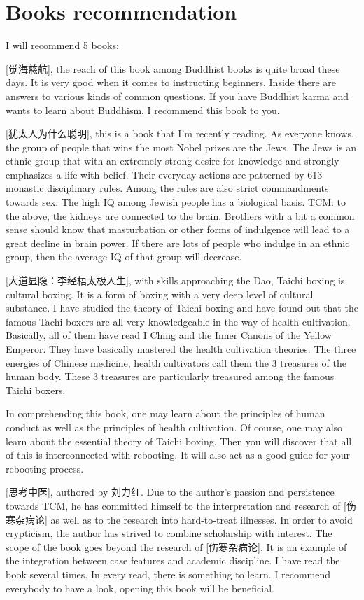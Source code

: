 \documentclass[
]{book}
\begin{document}
\hypertarget{books-recommendation-4}{%
\section{Books recommendation}\label{books-recommendation-4}}

I will recommend 5 books:

{[}觉海慈航{]}, the reach of this book among Buddhist books is quite broad these days. It is very good when it comes to instructing beginners. Inside there are answers to various kinds of common questions. If you have Buddhist karma and wants to learn about Buddhism, I recommend this book to you.

{[}犹太人为什么聪明{]}, this is a book that I'm recently reading. As everyone knows, the group of people that wins the most Nobel prizes are the Jews. The Jews is an ethnic group that with an extremely strong desire for knowledge and strongly emphasizes a life with belief. Their everyday actions are patterned by 613 monastic disciplinary rules. Among the rules are also strict commandments towards sex. The high IQ among Jewish people has a biological basis. TCM: to the above, the kidneys are connected to the brain. Brothers with a bit a common sense should know that masturbation or other forms of indulgence will lead to a great decline in brain power. If there are lots of people who indulge in an ethnic group, then the average IQ of that group will decrease.

{[}大道显隐：李经梧太极人生{]}, with skills approaching the Dao, Taichi boxing is cultural boxing. It is a form of boxing with a very deep level of cultural substance. I have studied the theory of Taichi boxing and have found out that the famous Tachi boxers are all very knowledgeable in the way of health cultivation. Basically, all of them have read I Ching and the Inner Canons of the Yellow Emperor. They have basically mastered the health cultivation theories. The three energies of Chinese medicine, health cultivators call them the 3 treasures of the human body. These 3 treasures are particularly treasured among the famous Taichi boxers.

In comprehending this book, one may learn about the principles of human conduct as well as the principles of health cultivation. Of course, one may also learn about the essential theory of Taichi boxing. Then you will discover that all of this is interconnected with rebooting. It will also act as a good guide for your rebooting process.

{[}思考中医{]}, authored by 刘力红. Due to the author's passion and persistence towards TCM, he has committed himself to the interpretation and research of {[}伤寒杂病论{]} as well as to the research into hard-to-treat illnesses. In order to avoid crypticism, the author has strived to combine scholarship with interest. The scope of the book goes beyond the research of {[}伤寒杂病论{]}. It is an example of the integration between case features and academic discipline. I have read the book several times. In every read, there is something to learn. I recommend everybody to have a look, opening this book will be beneficial.
\end{document}
